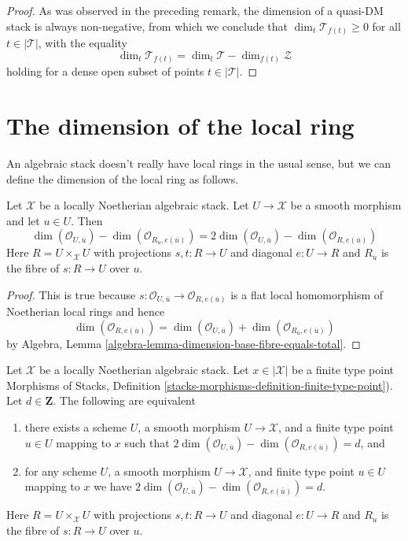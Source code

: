 \begin{proof}
As was observed in the preceding remark,
the dimension of a quasi-DM stack is always non-negative,
from which we conclude that $\dim_t \mathcal{T}_{f(t)} \geq 0$
for all $t \in |\mathcal{T}|$, with the equality
$$
\dim_t \mathcal{T}_{f(t)} = \dim_t \mathcal{T} - \dim_{f(t)} \mathcal{Z}
$$
holding
for a dense open subset of points $t\in |\mathcal{T}|$.
\end{proof}





\section{The dimension of the local ring}
\label{section-dimension-local-ring}

\noindent
An algebraic stack doesn't really have local rings in the usual sense,
but we can define the dimension of the local ring as follows.

\begin{lemma}
\label{lemma-dimension-local-ring-pre}
Let $\mathcal{X}$ be a locally Noetherian algebraic stack.
Let $U \to \mathcal{X}$ be a smooth morphism and let $u \in U$.
Then
$$
\dim(\mathcal{O}_{U, \overline{u}}) -
\dim(\mathcal{O}_{R_u, e(\overline{u})}) =
2\dim(\mathcal{O}_{U, \overline{u}}) -
\dim(\mathcal{O}_{R, e(\overline{u})})
$$
Here $R = U \times_\mathcal{X} U$ with projections $s, t : R \to U$ and
diagonal $e : U \to R$ and $R_u$ is the fibre of $s : R \to U$ over $u$.
\end{lemma}

\begin{proof}
This is true because
$s : \mathcal{O}_{U, \overline{u}} \to \mathcal{O}_{R, e(\overline{u})}$
is a flat local homomorphism of Noetherian local rings and hence
$$
\dim(\mathcal{O}_{R, e(\overline{u})}) =
\dim(\mathcal{O}_{U, \overline{u}}) +
\dim(\mathcal{O}_{R_u, e(\overline{u})})
$$
by
Algebra, Lemma \ref{algebra-lemma-dimension-base-fibre-equals-total}.
\end{proof}

\begin{lemma}
\label{lemma-dimension-local-ring}
Let $\mathcal{X}$ be a locally Noetherian algebraic stack.
Let $x \in |\mathcal{X}|$ be a finite type point 
Morphisms of Stacks, Definition
\ref{stacks-morphisms-definition-finite-type-point}).
Let $d \in \mathbf{Z}$.
The following are equivalent
\begin{enumerate}
\item there exists a scheme $U$, a smooth morphism $U \to \mathcal{X}$,
and a finite type point $u \in U$ mapping to $x$ such that
$2\dim(\mathcal{O}_{U, \overline{u}}) -
\dim(\mathcal{O}_{R, e(\overline{u})}) = d$, and
\item for any scheme $U$, a smooth morphism $U \to \mathcal{X}$,
and finite type point $u \in U$ mapping to $x$ we have
$2\dim(\mathcal{O}_{U, \overline{u}}) -
\dim(\mathcal{O}_{R, e(\overline{u})}) = d$.
\end{enumerate}
Here $R = U \times_\mathcal{X} U$ with projections $s, t : R \to U$ and
diagonal $e : U \to R$ and $R_u$ is the fibre of $s : R \to U$ over $u$.
\end{lemma}

